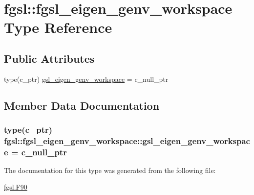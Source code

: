 \hypertarget{structfgsl_1_1fgsl__eigen__genv__workspace}{\section{fgsl\-:\-:fgsl\-\_\-eigen\-\_\-genv\-\_\-workspace Type Reference}
\label{structfgsl_1_1fgsl__eigen__genv__workspace}
}
\subsection*{Public Attributes}
\begin{DoxyCompactItemize}
\item 
type(c\-\_\-ptr) \hyperlink{structfgsl_1_1fgsl__eigen__genv__workspace_ae144c3babedc9df6774d58a4106dcb19}{gsl\-\_\-eigen\-\_\-genv\-\_\-workspace} = c\-\_\-null\-\_\-ptr
\end{DoxyCompactItemize}


\subsection{Member Data Documentation}
\hypertarget{structfgsl_1_1fgsl__eigen__genv__workspace_ae144c3babedc9df6774d58a4106dcb19}{
\subsubsection[{gsl\-\_\-eigen\-\_\-genv\-\_\-workspace}]{\setlength{\rightskip}{0pt plus 5cm}type(c\-\_\-ptr) fgsl\-::fgsl\-\_\-eigen\-\_\-genv\-\_\-workspace\-::gsl\-\_\-eigen\-\_\-genv\-\_\-workspace = c\-\_\-null\-\_\-ptr}}\label{structfgsl_1_1fgsl__eigen__genv__workspace_ae144c3babedc9df6774d58a4106dcb19}


The documentation for this type was generated from the following file\-:\begin{DoxyCompactItemize}
\item 
\hyperlink{fgsl_8F90}{fgsl.\-F90}\end{DoxyCompactItemize}
